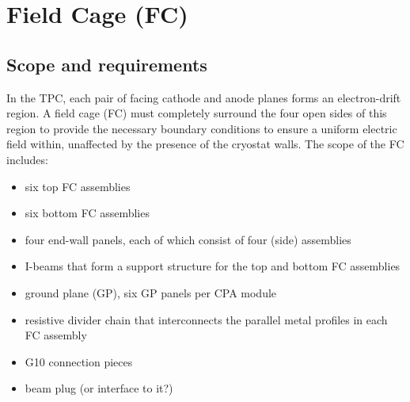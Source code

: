 



\section{Field Cage (FC)}
\label{detcompsec-fc}
\subsection{Scope and requirements} 

In the TPC, each pair of facing cathode and anode planes forms an electron-drift region. A field
cage (FC) must completely surround the four open sides of this region to provide the necessary boundary
conditions to ensure a uniform electric field within, unaffected by the presence of the cryostat walls.  The scope of the FC includes:

\begin{itemize}
\item six top FC assemblies
\item six bottom FC assemblies
\item four end-wall panels, each of which consist of four (side) assemblies
\item I-beams that form a support structure for the top and bottom FC assemblies
\item ground plane (GP), six GP panels per CPA module
\item resistive divider chain that interconnects the parallel metal profiles in each FC assembly
\item G10 connection pieces
\item beam plug (or interface to it?)
\end{itemize}


